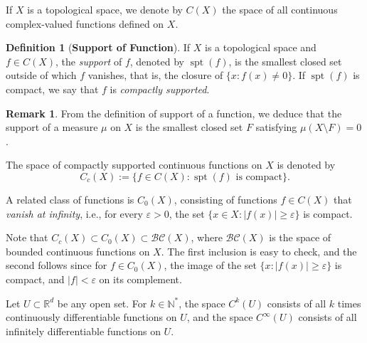\documentclass[12pt,a4paper]{report}
\theoremstyle{definition}
\newtheorem{definition}{Definition}
\newtheorem{remark}{Remark}
\begin{document}
If $X$ is a topological space, we denote by $C(X)$ the space of all continuous complex-valued functions defined on $X$.
\begin{definition} [\textbf{Support of Function}]
If \( X \) is a topological space and \( f \in C(X) \), the \textit{support} of \( f \), denoted by \( \operatorname{spt}(f) \), is the smallest closed set outside of which \( f \) vanishes, that is, the closure of \( \{x : f(x) \neq 0\} \). If \( \operatorname{spt}(f) \) is compact, we say that \( f \) is \textit{compactly supported}.
\end{definition}

\begin{remark}
From the definition of support of a function, we deduce that the support of a measure $\mu$ on $X$ is the smallest closed set $F$ satisfying $\mu(X \setminus F) = 0$.
\end{remark}

The space of compactly supported continuous functions on \( X \) is denoted by
\[
C_c(X) := \{ f \in C(X) : \operatorname{spt}(f) \text{ is compact} \}.
\]

A related class of functions is \( C_0(X) \), consisting of functions $f \in C(X)$ that \textit{vanish at infinity}, i.e., for every $\varepsilon > 0$, the set
\( \{ x \in X : |f(x)| \geq \varepsilon \} \) is compact.

Note that \(C_c(X) \subset C_0(X) \subset \mathcal{BC}(X)\), where $\mathcal{BC}(X)$ is the space of bounded continuous functions on $X$. The first inclusion is easy to check, and the second follows since for \( f \in C_0(X) \), the image of the set \( \{ x : |f(x)| \geq \varepsilon \} \) is compact, and \( |f| < \varepsilon \) on its complement. \label{BC}

Let $U \subset \mathbb{R}^d$ be any open set. For $k \in \mathbb{N}^*$, the space $C^k(U)$ consists of all $k$ times continuously differentiable functions on $U$, and the space $C^\infty(U)$ consists of all infinitely differentiable functions on $U$.
\end{document}
